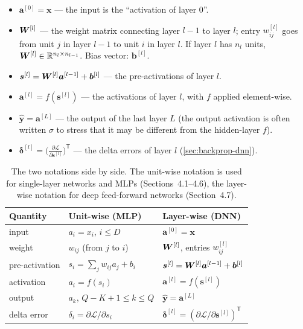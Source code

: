 \documentclass[11pt, oneside]{book}
\newcommand{\R}{\mathbb{R}}
\newcommand{\pd}[2]{\frac{\partial #1}{\partial #2}}
\newcommand{\T}{^{\mathsf{T}}}           %
\newcommand{\loss}{\mathcal{L}}          %
\newcommand{\params}{\boldsymbol{\theta}}   %
\newcommand{\bx}{\bm{x}}        \newcommand{\by}{\bm{y}}
\newcommand{\ba}{\bm{a}}        \newcommand{\bs}{\bm{s}}
\newcommand{\bb}{\bm{b}}        \newcommand{\bh}{\bm{h}}
\newcommand{\bdelta}{\bm{\delta}}
\newcommand{\byhat}{\hat{\bm{y}}}
\newcommand{\lay}[1]{^{[#1]}}            %
\begin{document}
\begin{defbox}[title={Layer-wise notation (deep feed-forward networks)}]
\begin{itemize}
  \item $\ba\lay{0} = \bx$ --- the input is the ``activation of layer 0''.
  \item $\bW\lay{l}$ --- the weight matrix connecting layer $l-1$ to layer
    $l$; entry $w\lay{l}_{ij}$ goes from unit $j$ in layer $l-1$ to unit $i$
    in layer $l$. If layer $l$ has $n_l$ units, $\bW\lay{l} \in
    \R^{n_l \times n_{l-1}}$. Bias vector: $\bb\lay{l}$.
  \item $\bs\lay{l} = \bW\lay{l} \ba\lay{l-1} + \bb\lay{l}$ --- the
    pre-activations of layer $l$.
  \item $\ba\lay{l} = f(\bs\lay{l})$ --- the activations of layer $l$, with
    $f$ applied element-wise.
  \item $\byhat = \ba\lay{L}$ --- the output of the last layer $L$ (the
    output activation is often written $\sigma$ to stress that it may be
    different from the hidden-layer $f$).
  \item $\bdelta\lay{l} = \bigl(\pd{\loss}{\bs\lay{l}}\bigr)\T$ --- the delta
    errors of layer $l$ (\cref{sec:backprop-dnn}).
\end{itemize}
\end{defbox}

\begin{table}[htbp]
\centering
\small
\begin{tabular}{@{}lll@{}}
\toprule
\textbf{Quantity} & \textbf{Unit-wise (MLP)} & \textbf{Layer-wise (DNN)} \\
\midrule
input              & $a_i = x_i$, $i \le D$   & $\ba\lay{0} = \bx$ \\
weight             & $w_{ij}$ (from $j$ to $i$) & $\bW\lay{l}$, entries $w\lay{l}_{ij}$ \\
pre-activation     & $s_i = \sum_j w_{ij} a_j + b_i$ & $\bs\lay{l} = \bW\lay{l}\ba\lay{l-1} + \bb\lay{l}$ \\
activation         & $a_i = f(s_i)$          & $\ba\lay{l} = f(\bs\lay{l})$ \\
output             & $a_k$, $Q-K+1 \le k \le Q$ & $\byhat = \ba\lay{L}$ \\
delta error        & $\delta_i = \partial\loss/\partial s_i$ & $\bdelta\lay{l} = (\partial\loss/\partial\bs\lay{l})\T$ \\
\bottomrule
\end{tabular}
\caption{The two notations side by side. The unit-wise notation is used for
single-layer networks and MLPs (Sections~4.1--4.6), the layer-wise notation
for deep feed-forward networks (Section~4.7).}
\label{tab:notation}
\end{table}
\end{document}
